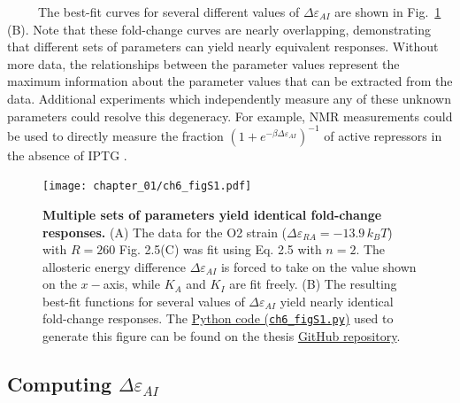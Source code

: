 \documentclass[12pt]{caltech_thesis}
\begin{document}
~~~~~The best-fit curves for several different values of
\(\Delta\varepsilon_{AI}\) are shown in Fig.~\ref{fig:degenerate_epai}
(B). Note that these fold-change curves are nearly overlapping,
demonstrating that different sets of parameters can yield nearly
equivalent responses. Without more data, the relationships between the
parameter values represent the maximum information about the parameter
values that can be extracted from the data. Additional experiments which
independently measure any of these unknown parameters could resolve this
degeneracy. For example, NMR measurements could be used to directly
measure the fraction \((1 + e^{-\beta \Delta\varepsilon_{AI}})^{-1}\) of
active repressors in the absence of IPTG
\autocite{gardino2003,boulton2016}.

\hypertarget{fig:degenerate_epai}{%
\begin{figure}
\centering
\texttt{[image: chapter\_01/ch6\_figS1.pdf]}
\caption[{Multiple sets of parameters yield identical fold-change
responses.}]{\textbf{Multiple sets of parameters yield identical
fold-change responses.} (A) The data for the O2 strain
(\(\Delta\varepsilon_{RA}=-13.9\, k_BT\)) with \(R=260\) Fig. 2.5(C) was
fit using Eq. 2.5 with \(n=2\). The allosteric energy difference
\(\Delta\varepsilon_{AI}\) is forced to take on the value shown on the
\(x-\)axis, while \(K_A\) and \(K_I\) are fit freely. (B) The resulting
best-fit functions for several values of \(\Delta\varepsilon_{AI}\)
yield nearly identical fold-change responses. The
\href{https://github.com/gchure/phd/blob/master/src/chapter_06/code/ch6_figS1.py}{Python
code (\texttt{ch6\_figS1.py})} used to generate this figure can be found
on the thesis \href{https://github.com/gchure/phd}{GitHub repository}.}
\label{fig:degenerate_epai}
\end{figure}
}

\hypertarget{computing-deltavarepsilon_ai}{%
\subsection{\texorpdfstring{Computing
\(\Delta\varepsilon_{AI}\)}{Computing \textbackslash Delta\textbackslash varepsilon\_\{AI\}}}\label{computing-deltavarepsilon_ai}}
\end{document}
